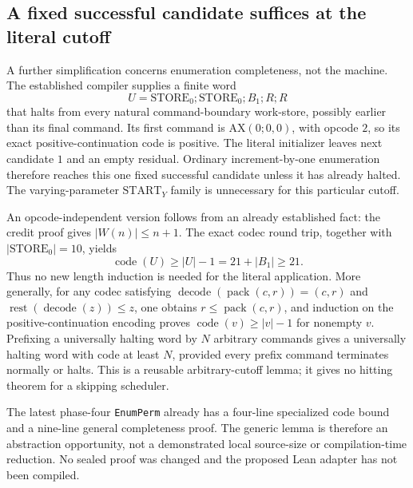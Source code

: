 \subsection{A fixed successful candidate suffices at the literal cutoff}
A further simplification concerns enumeration completeness, not the machine.
The established compiler supplies a finite word
\[
 U=\mathrm{STORE}_0;\mathrm{STORE}_0;B_1;R;R
\]
that halts from every natural command-boundary work-store, possibly earlier
than its final command. Its first command is $\mathrm{AX}(0;0,0)$, with
opcode $2$, so its exact positive-continuation code is positive. The literal
initializer leaves next candidate $1$ and an empty residual. Ordinary
increment-by-one enumeration therefore reaches this one fixed successful
candidate unless it has already halted. The varying-parameter
$\mathrm{START}_Y$ family is unnecessary for this particular cutoff.

An opcode-independent version follows from an already established fact:
the credit proof gives $|W(n)|\le n+1$. The exact codec round trip, together
with $|\mathrm{STORE}_0|=10$, yields
\[
 \operatorname{code}(U)\ge |U|-1=21+|B_1|\ge21.
\]
Thus no new length induction is needed for the literal application. More
generally, for any codec satisfying
$\operatorname{decode}(\operatorname{pack}(c,r))=(c,r)$ and
$\operatorname{rest}(\operatorname{decode}(z))\le z$, one obtains
$r\le\operatorname{pack}(c,r)$, and induction on the positive-continuation
encoding proves $\operatorname{code}(v)\ge |v|-1$ for nonempty $v$.
Prefixing a universally halting word by $N$ arbitrary commands gives a
universally halting word with code at least $N$, provided every prefix
command terminates normally or halts. This is a reusable arbitrary-cutoff
lemma; it gives no hitting theorem for a skipping scheduler.

The latest phase-four \texttt{EnumPerm} already has a four-line specialized
code bound and a nine-line general completeness proof. The generic lemma is
therefore an abstraction opportunity, not a demonstrated local source-size
or compilation-time reduction. No sealed proof was changed and the proposed
Lean adapter has not been compiled.
